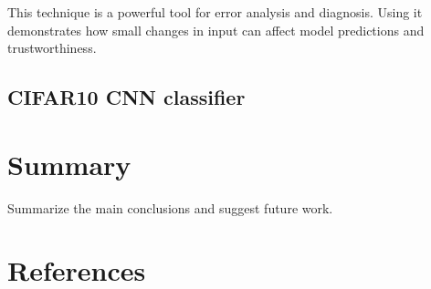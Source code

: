 \documentclass[journal, a4paper]{IEEEtran}
\begin{document}
This technique is a powerful tool for error analysis and diagnosis.
Using it demonstrates how small changes in input can affect model predictions and trustworthiness.

\subsection{CIFAR10 CNN classifier}\label{subsec:experiment-cifar}

\section{Summary}\label{sec:summary}
Summarize the main conclusions and suggest future work.

\section{References}\label{sec:references}



\end{document}
